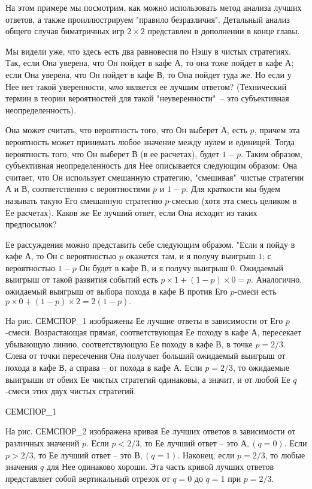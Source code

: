 {На этом примере мы посмотрим, как можно использовать метод анализа лучших
ответов, а также проиллюстрируем "правило безразличия". Детальный анализ
общего случая биматричных игр $2\times2$ представлен в дополнении в конце главы.

Мы видели уже, что здесь есть два равновесия по Нэшу в чистых стратегиях.
Так, если Она уверена, что Он пойдет в кафе А, то она тоже пойдет в кафе А;
если Она уверена, что Он пойдет в кафе В, то Она пойдет туда же. Но если
у Нее нет такой уверенности, \emph{что} является ее лучшим ответом?
(Технический термин в теории вероятностей для такой "неуверенности"\, --
это субъективная неопределенность).

Она может считать, что вероятность того, что Он выберет А, есть
$p$, причем эта вероятность может принимать любое значение между нулем и единицей.
Тогда вероятность того, что Он выберет В (в ее расчетах), будет $1-p$.
Таким образом, субъективная неопределенность для Нее описывается следующим образом:
Она считает, что Он использует смешанную стратегию, "смешивая"\, чистые стратегии
А и В, соответственно с вероятностями $p$ и $1-p$. Для краткости мы будем называть
такую Его смешанную стратегию $p$-смесью (хотя эта смесь целиком в Ее расчетах).
Каков же Ее лучший ответ, если Она исходит из таких предпосылок?

Ее рассуждения можно представить себе следующим образом. "Если я пойду в кафе А,
то Он с вероятностью $p$ окажется там, и я получу выигрыш $1$; с вероятностью
$1-p$ Он будет в кафе В, и я получу выигрыш $0$. Ожидаемый выигрыш от такой развития
событий есть $p\times1+(1-p)\times0=p$. Аналогично, ожидаемый выигрыш от выбора
похода в кафе В против Его $p$-смеси есть $p\times0+(1-p)\times2=2(1-p).$

На рис. СЕМСПОР_1 изображены Ее лучшие ответы в зависимости от Его $p$-смеси.
Возрастающая прямая, соответствующая Ее походу в кафе А, пересекает убывающую
линию, соответствующую Ее походу в кафе В, в точке $p=2/3$. Слева от точки пересечения
Она получает больший ожидаемый выигрыш от похода в кафе В, а справа -- от похода в кафе А.
Если $p=2/3$, то ожидаемые выигрыши от обеих Ее чистых стратегий одинаковы, а значит,
и от любой Ее $q$-смеси этих двух чистых стратегий.

СЕМСПОР_1

На рис. СЕМСПОР_2 изображена кривая Ее лучших ответов в зависимости от различных значений $p$.
Если $p<2/3$, то Ее лучший ответ -- это $А, (q=0)$. Если $p>2/3$, то Ее лучший ответ --
это $В, (q=1)$. Наконец, если $p=2/3$, то любые значения $q$ для Нее одинаково хороши.
Эта часть кривой лучших ответов представляет собой вертикальный отрезок от $q=0$ до $q=1$
при $p=2/3$.

}
